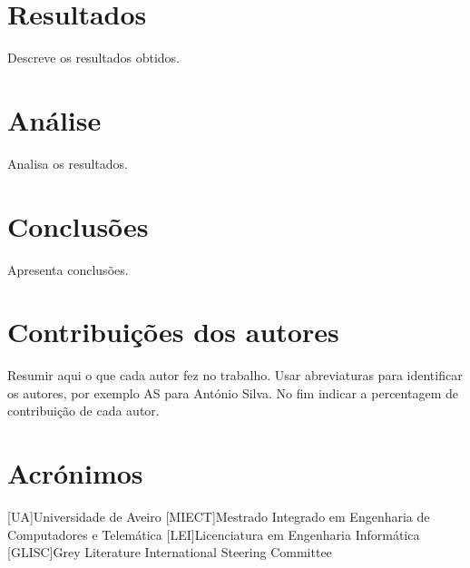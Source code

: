\documentclass{report}
\begin{document}
\chapter{Resultados}
\label{chap.resultados}
Descreve os resultados obtidos.

\chapter{Análise}
\label{chap.analise}
Analisa os resultados.

\chapter{Conclusões}
\label{chap.conclusao}
Apresenta conclusões.

\chapter*{Contribuições dos autores}
Resumir aqui o que cada autor fez no trabalho.
Usar abreviaturas para identificar os autores,
por exemplo AS para António Silva.
No fim indicar a percentagem de contribuição de cada autor.

\chapter*{Acrónimos}
\begin{acronym}
[UA]{Universidade de Aveiro}
[MIECT]{Mestrado Integrado em Engenharia de Computadores e Telemática}
[LEI]{Licenciatura em Engenharia Informática}
[GLISC]{Grey Literature International Steering Committee}
\end{acronym}


\printbibliography
\end{document}
